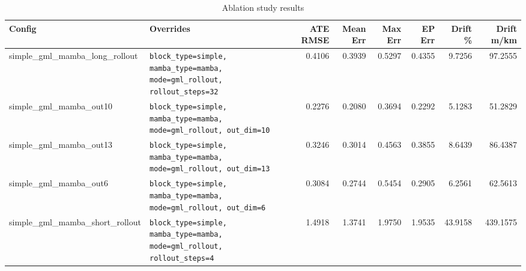 \begin{table}[ht]
\centering
\caption{Ablation study results}
\label{tab:ablation}
\small
\setlength{\tabcolsep}{4pt}
\begin{tabular}{ll rr rr rr}
\toprule
\textbf{Config} & \textbf{Overrides} &
\textbf{ATE RMSE} & \textbf{Mean Err} &
\textbf{Max Err} & \textbf{EP Err} &
\textbf{Drift \%} & \textbf{Drift m/km} \\
\midrule
simple\_gml\_mamba\_long\_rollout & \texttt{block\_type=simple, mamba\_type=mamba, mode=gml\_rollout, rollout\_steps=32} & 0.4106 & 0.3939 & 0.5297 & 0.4355 & 9.7256 & 97.2555 \\
simple\_gml\_mamba\_out10 & \texttt{block\_type=simple, mamba\_type=mamba, mode=gml\_rollout, out\_dim=10} & 0.2276 & 0.2080 & 0.3694 & 0.2292 & 5.1283 & 51.2829 \\
simple\_gml\_mamba\_out13 & \texttt{block\_type=simple, mamba\_type=mamba, mode=gml\_rollout, out\_dim=13} & 0.3246 & 0.3014 & 0.4563 & 0.3855 & 8.6439 & 86.4387 \\
simple\_gml\_mamba\_out6 & \texttt{block\_type=simple, mamba\_type=mamba, mode=gml\_rollout, out\_dim=6} & 0.3084 & 0.2744 & 0.5454 & 0.2905 & 6.2561 & 62.5613 \\
simple\_gml\_mamba\_short\_rollout & \texttt{block\_type=simple, mamba\_type=mamba, mode=gml\_rollout, rollout\_steps=4} & 1.4918 & 1.3741 & 1.9750 & 1.9535 & 43.9158 & 439.1575 \\
\bottomrule
\end{tabular}
\end{table}

